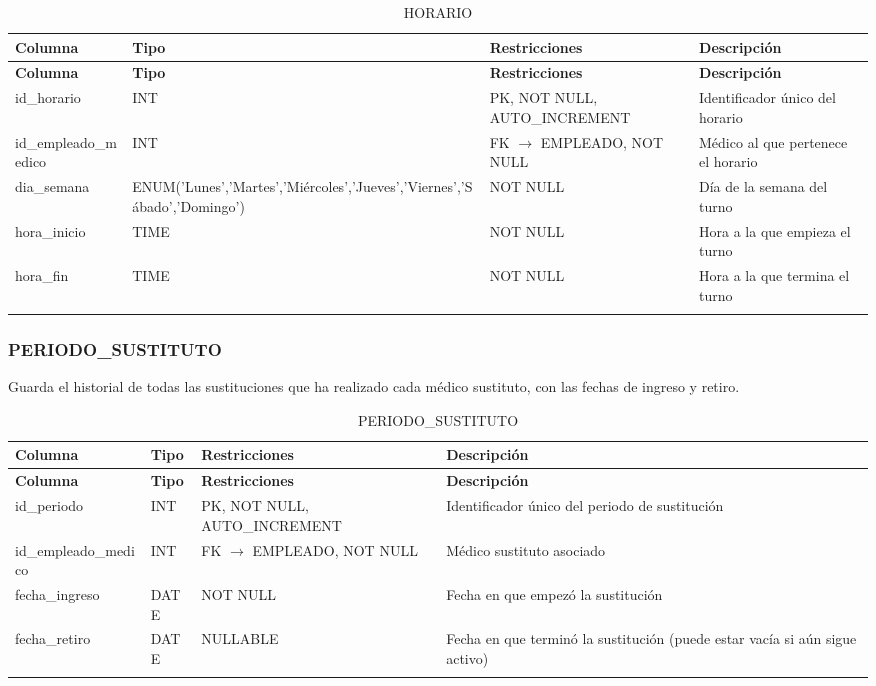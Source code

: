 \documentclass[12pt,a4paper]{article}
\begin{document}
{\small\begin{longtable}{|p{2.3cm}|p{3.3cm}|p{4.2cm}|p{4.2cm}|}
\hline
\textbf{Columna} & \textbf{Tipo} & \textbf{Restricciones} & \textbf{Descripci\'on} \\ \hline
\endfirsthead
\hline
\textbf{Columna} & \textbf{Tipo} & \textbf{Restricciones} & \textbf{Descripci\'on} \\ \hline
\endhead
id\_horario & INT & PK, NOT NULL, AUTO\_INCREMENT & Identificador \'unico del horario \\ \hline
id\_empleado\_medico & INT & FK $\rightarrow$ EMPLEADO, NOT NULL & M\'edico al que pertenece el horario \\ \hline
dia\_semana & ENUM('Lunes','Martes','Mi\'ercoles','Jueves','Viernes','S\'abado','Domingo') & NOT NULL & D\'ia de la semana del turno \\ \hline
hora\_inicio & TIME & NOT NULL & Hora a la que empieza el turno \\ \hline
hora\_fin & TIME & NOT NULL & Hora a la que termina el turno \\ \hline
\caption{HORARIO}
\end{longtable}}

\subsubsection{PERIODO\_SUSTITUTO}
Guarda el historial de todas las sustituciones que ha realizado cada m\'edico sustituto, con las fechas de ingreso y retiro.

{\small\begin{longtable}{|p{2.3cm}|p{3.3cm}|p{4.2cm}|p{4.2cm}|}
\hline
\textbf{Columna} & \textbf{Tipo} & \textbf{Restricciones} & \textbf{Descripci\'on} \\ \hline
\endfirsthead
\hline
\textbf{Columna} & \textbf{Tipo} & \textbf{Restricciones} & \textbf{Descripci\'on} \\ \hline
\endhead
id\_periodo & INT & PK, NOT NULL, AUTO\_INCREMENT & Identificador \'unico del periodo de sustituci\'on \\ \hline
id\_empleado\_medico & INT & FK $\rightarrow$ EMPLEADO, NOT NULL & M\'edico sustituto asociado \\ \hline
fecha\_ingreso & DATE & NOT NULL & Fecha en que empez\'o la sustituci\'on \\ \hline
fecha\_retiro & DATE & NULLABLE & Fecha en que termin\'o la sustituci\'on (puede estar vac\'ia si a\'un sigue activo) \\ \hline
\caption{PERIODO\_SUSTITUTO}
\end{longtable}}
\end{document}
